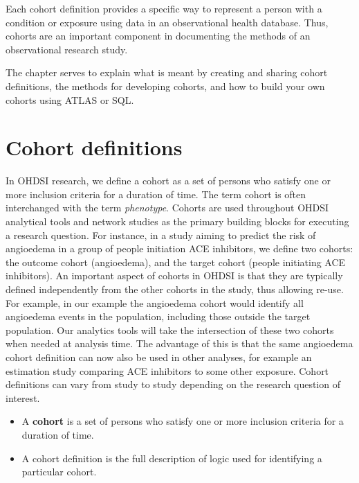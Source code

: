 \documentclass[11pt]{book}
\providecommand{\tightlist}{%
  \setlength{\itemsep}{0pt}\setlength{\parskip}{0pt}}
\theoremstyle{definition}
\theoremstyle{definition}
\theoremstyle{definition}
\theoremstyle{remark}
\let\BeginKnitrBlock\begin \let\EndKnitrBlock\end
\begin{document}
Each cohort definition provides a specific way to represent a person with a condition or exposure using data in an observational health database. Thus, cohorts are an important component in documenting the methods of an observational research study.

The chapter serves to explain what is meant by creating and sharing cohort definitions, the methods for developing cohorts, and how to build your own cohorts using ATLAS or SQL.

\hypertarget{cohort-definitions}{%
\section{Cohort definitions}\label{cohort-definitions}}

In OHDSI research, we define a cohort as a set of persons who satisfy one or more inclusion criteria for a duration of time. The term cohort is often interchanged with the term \emph{phenotype}. Cohorts are used throughout OHDSI analytical tools and network studies as the primary building blocks for executing a research question. For instance, in a study aiming to predict the risk of angioedema in a group of people initiation ACE inhibitors, we define two cohorts: the outcome cohort (angioedema), and the target cohort (people initiating ACE inhibitors). An important aspect of cohorts in OHDSI is that they are typically defined independently from the other cohorts in the study, thus allowing re-use. For example, in our example the angioedema cohort would identify all angioedema events in the population, including those outside the target population. Our analytics tools will take the intersection of these two cohorts when needed at analysis time. The advantage of this is that the same angioedema cohort definition can now also be used in other analyses, for example an estimation study comparing ACE inhibitors to some other exposure. Cohort definitions can vary from study to study depending on the research question of interest.

\BeginKnitrBlock{rmdimportant}
\begin{itemize}
\tightlist
\item
  A \textbf{cohort} is a set of persons who satisfy one or more inclusion criteria for a duration of time.
\item
  A cohort definition is the full description of logic used for identifying a particular cohort.
\end{itemize}
\EndKnitrBlock{rmdimportant}
\end{document}
